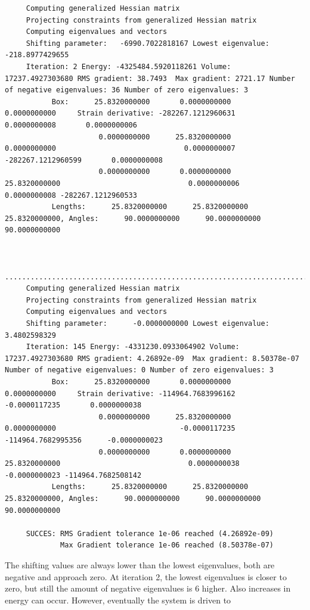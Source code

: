 \begin{tiny}
\begin{verbatim}
     Computing generalized Hessian matrix
     Projecting constraints from generalized Hessian matrix
     Computing eigenvalues and vectors
     Shifting parameter:   -6990.7022818167 Lowest eigenvalue:    -218.8977429655
     Iteration: 2 Energy: -4325484.5920118261 Volume:   17237.4927303680 RMS gradient: 38.7493  Max gradient: 2721.17 Number of negative eigenvalues: 36 Number of zero eigenvalues: 3
           Box:      25.8320000000       0.0000000000       0.0000000000     Strain derivative: -282267.1212960631       0.0000000008       0.0000000006
                      0.0000000000      25.8320000000       0.0000000000                              0.0000000007 -282267.1212960599       0.0000000008
                      0.0000000000       0.0000000000      25.8320000000                              0.0000000006       0.0000000008 -282267.1212960533
           Lengths:      25.8320000000      25.8320000000      25.8320000000, Angles:      90.0000000000      90.0000000000      90.0000000000


     ..........................................................................
     Computing generalized Hessian matrix
     Projecting constraints from generalized Hessian matrix
     Computing eigenvalues and vectors
     Shifting parameter:      -0.0000000000 Lowest eigenvalue:       3.4802598329
     Iteration: 145 Energy: -4331230.0933064902 Volume:   17237.4927303680 RMS gradient: 4.26892e-09  Max gradient: 8.50378e-07 Number of negative eigenvalues: 0 Number of zero eigenvalues: 3
           Box:      25.8320000000       0.0000000000       0.0000000000     Strain derivative: -114964.7683996162      -0.0000117235       0.0000000038
                      0.0000000000      25.8320000000       0.0000000000                             -0.0000117235 -114964.7682995356      -0.0000000023
                      0.0000000000       0.0000000000      25.8320000000                              0.0000000038      -0.0000000023 -114964.7682508142
           Lengths:      25.8320000000      25.8320000000      25.8320000000, Angles:      90.0000000000      90.0000000000      90.0000000000
     
     SUCCES: RMS Gradient tolerance 1e-06 reached (4.26892e-09)
             Max Gradient tolerance 1e-06 reached (8.50378e-07)
\end{verbatim}
\end{tiny}
The shifting values are always lower than the lowest eigenvalues, both are negative and approach zero. At iteration 2, the lowest eigenvalues is closer
to zero, but still the amount of negative eigenvalues is 6 higher. Also increases in energy can occur. However, eventually the system is driven to

